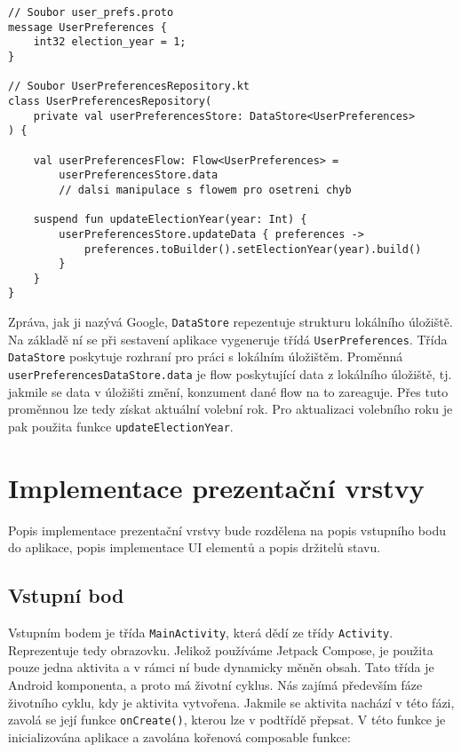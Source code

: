 \begin{lstlisting}[caption={Ukázka práce s Proto DataStore}, label={lst:proto-datastore}, tabsize=2]
// Soubor user_prefs.proto
message UserPreferences {
	int32 election_year = 1;
}

// Soubor UserPreferencesRepository.kt
class UserPreferencesRepository(
	private val userPreferencesStore: DataStore<UserPreferences>
) {
	
	val userPreferencesFlow: Flow<UserPreferences> = 
		userPreferencesStore.data
		// dalsi manipulace s flowem pro osetreni chyb
	
	suspend fun updateElectionYear(year: Int) {
		userPreferencesStore.updateData { preferences ->
			preferences.toBuilder().setElectionYear(year).build()
		}
	}
}
\end{lstlisting}

\noindent Zpráva, jak ji nazývá Google, \lstinline|DataStore| repezentuje strukturu lokálního úložiště. Na základě ní se při sestavení aplikace vygeneruje třídá \lstinline|UserPreferences|. Třída \lstinline|DataStore| poskytuje rozhraní pro práci s lokálním úložištěm. Proměnná \lstinline|userPreferencesDataStore.data| je flow poskytující data z lokálního úložiště, tj. jakmile se data v úložišti změní, konzument dané flow na to zareaguje. Přes tuto proměnnou lze tedy získat aktuální volební rok. Pro aktualizaci volebního roku je pak použita funkce \lstinline|updateElectionYear|.

\section {Implementace prezentační vrstvy}
Popis implementace prezentační vrstvy bude rozdělena na popis vstupního bodu do \linebreak aplikace, popis implementace UI elementů a popis držitelů stavu.

\subsection*{Vstupní bod}
Vstupním bodem je třída \lstinline|MainActivity|, která dědí ze třídy \lstinline|Activity|. Reprezentuje tedy obrazovku. Jelikož používáme Jetpack Compose, je použita pouze jedna aktivita a v rámci ní bude dynamicky měněn obsah. Tato třída je Android komponenta, a proto má životní cyklus. Nás zajímá především fáze životního cyklu, kdy je aktivita vytvořena. Jakmile se aktivita nachází v této fázi, zavolá se její funkce \lstinline|onCreate()|, kterou lze v podtřídě přepsat. V této funkce je inicializována aplikace a zavolána kořenová composable funkce:

